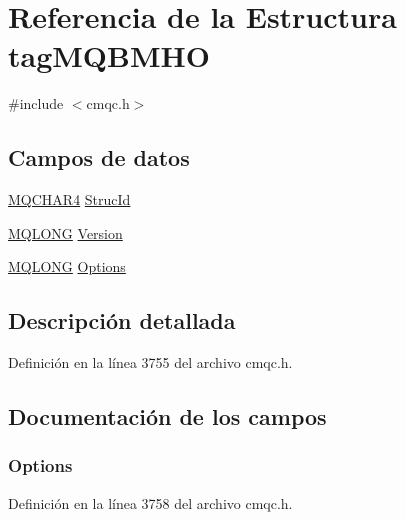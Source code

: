 \hypertarget{structtag_m_q_b_m_h_o}{}\section{Referencia de la Estructura tag\+M\+Q\+B\+M\+H\+O}
\label{structtag_m_q_b_m_h_o}


{\ttfamily \#include $<$cmqc.\+h$>$}

\subsection*{Campos de datos}
\begin{DoxyCompactItemize}
\item 
\hyperlink{cmqc_8h_a12590e546ed66fda7cf21c1d5cefa31d}{M\+Q\+C\+H\+A\+R4} \hyperlink{structtag_m_q_b_m_h_o_a0530922ca944569b52601d74941f96e4}{Struc\+Id}
\item 
\hyperlink{cmqc_8h_a1fb8d28cbda3fa8766a9821230cdb6d5}{M\+Q\+L\+O\+N\+G} \hyperlink{structtag_m_q_b_m_h_o_a0656ef8f766b3907d394d88a35d7b7e9}{Version}
\item 
\hyperlink{cmqc_8h_a1fb8d28cbda3fa8766a9821230cdb6d5}{M\+Q\+L\+O\+N\+G} \hyperlink{structtag_m_q_b_m_h_o_ad7aff2d6c6044809464380998d24ec5c}{Options}
\end{DoxyCompactItemize}


\subsection{Descripción detallada}


Definición en la línea 3755 del archivo cmqc.\+h.



\subsection{Documentación de los campos}
\hypertarget{structtag_m_q_b_m_h_o_ad7aff2d6c6044809464380998d24ec5c}{}
\subsubsection[{Options}]{ Options}\label{structtag_m_q_b_m_h_o_ad7aff2d6c6044809464380998d24ec5c}


Definición en la línea 3758 del archivo cmqc.\+h.

